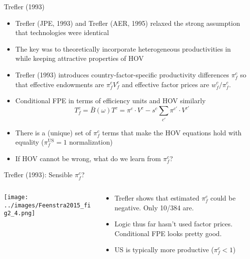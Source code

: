 \documentclass[10pt,notes=hide]{beamer}
\begin{document}
\begin{frame}{Trefler (1993)}
\begin{itemize}
	\item Trefler (JPE, 1993) and Trefler (AER, 1995) relaxed the strong assumption that technologies were identical
	\item The key was to theoretically incorporate heterogeneous productivities in while keeping attractive properties of HOV
	\item Trefler (1993) introduces country-factor-specific productivity differences $\pi_f^c$ so that effective endowments are $\pi_f^c V_f^c$ and effective factor prices are $w_f^c/\pi_f^c$.
	\item Conditional FPE in terms of efficiency units and HOV similarly
	$$T_{f}^{c} = \bar{B}(\omega) T^c  = \pi^c \cdot V^c - s^c \sum_{c'} \pi^{c'} \cdot V^{c'} $$
	\item There is a (unique) set of $\pi_f^c$ terms that make the HOV equations hold with equality ($\pi_f^{\text{US}}=1$ normalization)
	\item If HOV cannot be wrong, what do we learn from $\pi_f^c$?
\end{itemize}
\end{frame}
\begin{frame}{Trefler (1993): Sensible $\pi_f^c$?}
\begin{columns}
\begin{column}{.6\textwidth}
\texttt{[image: ../images/Feenstra2015\_fig2\_4.png]}
\end{column}
\begin{column}{.38\textwidth}
	\begin{itemize}
		\item Trefler shows that estimated $\pi_f^c$ could be negative. Only 10/384 are.
		\item Logic thus far hasn't used factor prices. Conditional FPE looks pretty good.
		\item US is typically more productive ($\pi_f^c<1$)
	\end{itemize}
\end{column}
\end{columns}
\end{frame}
\end{document}
